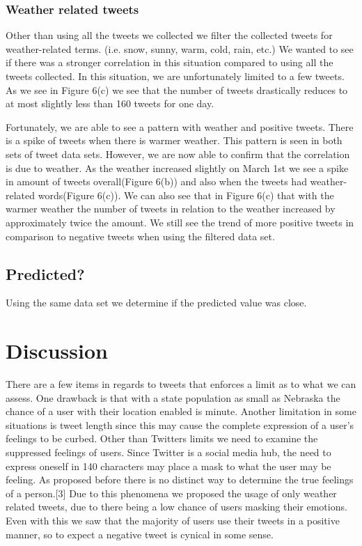 \documentclass[journal]{vgtc}                %
\begin{document}
\subsubsection{Weather related tweets}
Other than using all the tweets we collected we filter the collected tweets for weather-related terms. (i.e. snow, sunny, warm, cold, rain, etc.) We wanted to see if there was a stronger correlation in this situation compared to using all the tweets collected. In this situation, we are unfortunately limited to a few tweets. As we see in Figure 6(c) we see that the number of tweets drastically reduces to at most slightly less than 160 tweets for one day. 

Fortunately, we are able to see a pattern with weather and positive tweets. There is a spike of tweets when there is warmer weather. This pattern is seen in both sets of tweet data sets. However, we are now able to confirm that the correlation is due to weather. As the weather increased slightly on March 1st we see a spike in amount of tweets overall(Figure 6(b)) and also when the tweets had weather-related words(Figure 6(c)). We can also see that in Figure 6(c) that with the warmer weather the number of tweets in relation to the weather increased by approximately twice the amount. We still see the trend of more positive tweets in comparison to negative tweets when using the filtered data set.


\newpage

\subsection{Predicted?}
Using the same data set we determine if the predicted value was close. 


\newpage


\section{Discussion}
There are a few items in regards to tweets that enforces a limit as to what we can assess. One drawback is that with a state population as small as Nebraska the chance of a user with their location enabled is minute. Another limitation in some situations is tweet length since this may cause the complete expression of a user's feelings to be curbed. Other than Twitters limits we need to examine the suppressed feelings of users. Since Twitter is a social media hub, the need to express oneself in 140 characters may place a mask to what the user may be feeling. As proposed before there is no distinct way to determine the true feelings of a person.[3] Due to this phenomena we proposed the usage of only weather related tweets, due to there being a low chance of users masking their emotions. Even with this we saw that the majority of users use their tweets in a positive manner, so to expect a negative tweet is cynical in some sense. 
\end{document}
